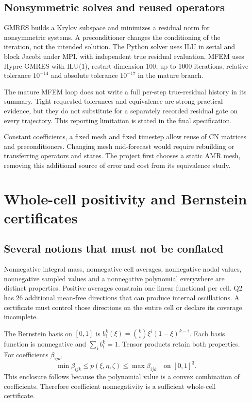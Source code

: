\section{Nonsymmetric solves and reused operators}
GMRES builds a Krylov subspace and minimizes a residual norm for nonsymmetric systems. A preconditioner changes the conditioning of the iteration, not the intended solution. The Python solver uses ILU in serial and block Jacobi under MPI, with independent true residual evaluation. MFEM uses Hypre GMRES with ILU(1), restart dimension 100, up to 1000 iterations, relative tolerance $10^{-14}$ and absolute tolerance $10^{-17}$ in the mature branch.

The mature MFEM loop does not write a full per-step true-residual history in its summary. Tight requested tolerances and equivalence are strong practical evidence, but they do not substitute for a separately recorded residual gate on every trajectory. This reporting limitation is stated in the final specification.

Constant coefficients, a fixed mesh and fixed timestep allow reuse of CN matrices and preconditioners. Changing mesh mid-forecast would require rebuilding or transferring operators and states. The project first chooses a static AMR mesh, removing this additional source of error and cost from its equivalence study.

\chapter{Whole-cell positivity and Bernstein certificates}\label{ch:bernstein}
\section{Several notions that must not be conflated}
Nonnegative integral mass, nonnegative cell averages, nonnegative nodal values, nonnegative sampled values and a nonnegative polynomial everywhere are distinct properties. Positive averages constrain one linear functional per cell. Q2 has 26 additional mean-free directions that can produce internal oscillations. A certificate must control those directions on the entire cell or declare its coverage incomplete.

The Bernstein basis on $[0,1]$ is $b_i^k(\xi)=\binom ki\xi^i(1-\xi)^{k-i}$. Each basis function is nonnegative and $\sum_ib_i^k=1$. Tensor products retain both properties. For coefficients $\beta_{ijk}$,
\begin{equation}\label{eq:bernstein-enclosure}
\min\beta_{ijk}\le p(\xi,\eta,\zeta)\le\max\beta_{ijk}\quad\text{on }[0,1]^3.
\end{equation}
This enclosure follows because the polynomial value is a convex combination of coefficients. Therefore coefficient nonnegativity is a sufficient whole-cell certificate.

